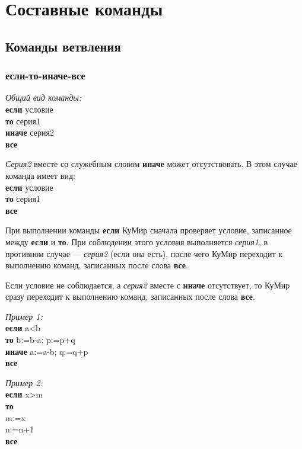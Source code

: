 \section{Составные команды}

\subsection{Команды ветвления}

\subsubsection{если-то-иначе-все}

\emph{Общий вид команды:}\\
{\sffamily
\textbf{если} условие\\
\otstup \textbf{то} серия1\\
\otstup \textbf{иначе} серия2\\
\textbf{все}
}

\emph{Серия2} вместе со служебным словом \textbf{иначе} может отсутствовать. В этом случае команда имеет вид:\\
{\sffamily
\textbf{если} условие\\
\textbf{то} серия1\\
\textbf{все} 
}

При выполнении команды \textbf{если} КуМир сначала проверяет условие, записанное между \textbf{если} и \textbf{то}. При соблюдении этого условия выполняется \emph{серия1}, в противном случае --- \emph{серия2} (если она есть), после чего КуМир переходит к выполнению команд, записанных после слова \textbf{все}.

Если условие не соблюдается, а \emph{серия2} вместе с \textbf{иначе} отсутствует, то КуМир сразу переходит к выполнению команд, записанных после слова \textbf{все}.

\emph{Пример 1:}\\
{\sffamily
\textbf{если} a<b\\
\otstup \textbf{то} b:=b-a; p:=p+q\\
\otstup \textbf{иначе} a:=a-b; q:=q+p\\
\textbf{все}
}

\emph{Пример 2:}\\
{\sffamily
\textbf{если} x>m\\
\otstup \textbf{то}\\
\otstup \otstup m:=x\\
\otstup \otstup n:=n+1\\
\textbf{все}
}

